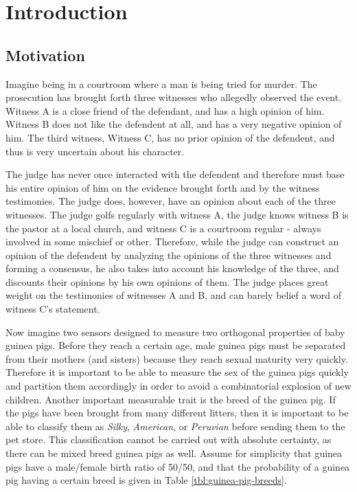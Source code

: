 \documentclass[thesis.tex]{subfiles}
\begin{document}
\chapter{Introduction}



\section{Motivation}

Imagine being in a courtroom where a man is being tried for murder. The prosecution has
brought forth three witnesses who allegedly observed the event. Witness A is a close friend
of the defendant, and has a high opinion of him. Witness B does not like the defendent at
all, and has a very negative opinion of him. The third witness, Witness C, has no prior
opinion of the defendent, and thus is very uncertain about his character.

The judge has never once interacted with the defendent and therefore must base his entire
opinion of him on the evidence brought forth and by the witness testimonies. The
judge does, however, have an opinion about each of the three witnesses. The judge golfs regularly with
witness A, the judge knows witness B is the pastor at a local church, and witness C is a
courtroom regular - always involved in some mischief or other. Therefore, while the judge
can construct an opinion of the defendent by analyzing the opinions of the three witnesses and forming a
consensus, he also takes into account his knowledge of the three, and discounts their
opinions by his own opinions of them. The judge places great weight on the testimonies of
witnesses A and B, and can barely belief a word of witness C's statement.

Now imagine two sensors designed to measure two orthogonal properties of baby guinea pigs.
Before they reach a certain age, male guinea pigs must be separated from their mothers
(and sisters) because they reach sexual maturity very quickly. Therefore it is important to
be able to measure the sex of the guinea pigs quickly and partition them
accordingly in order to avoid a combinatorial explosion of new children. Another important
measurable trait is the breed of the guinea pig. If the
pigs have been brought from many different litters, then it is important to be able to
classify them as \emph{Silky}, \emph{American}, or \emph{Peruvian} before sending them to the pet store.
This classification cannot be carried out with absolute certainty, as there can be mixed breed guinea pigs as well.
Assume for simplicity that guinea pigs have a male/female birth ratio of 50/50, and that the
probability of a guinea pig having a certain breed is given in Table \ref{tbl:guinea-pig-breeds}.
\end{document}
